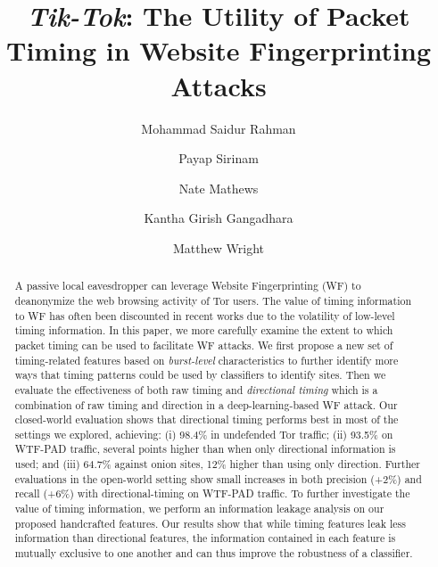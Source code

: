\documentclass[USenglish,oneside,twocolumn]{article}
\newcommand{\attack}{{\em Tik-Tok}}
\begin{document}
\author*[1]{Mohammad Saidur Rahman}

  \author[2]{Payap Sirinam}

  \author[3]{Nate Mathews}

  \author[4]{Kantha Girish Gangadhara}

  \author[5]{Matthew Wright}







  \title{\huge \attack: The Utility of Packet Timing in Website Fingerprinting Attacks}

  \runningtitle{\attack}



\begin{abstract}
{
A passive local eavesdropper can leverage Website Fingerprinting (WF) to deanonymize the web browsing activity of Tor users. The value of timing information to WF has often been discounted in recent works due to the volatility of low-level timing information. In this paper, we more carefully examine the extent to which packet timing can be used to facilitate WF attacks. We first propose a new set of timing-related features based on \emph{burst-level} characteristics to further identify more ways that timing patterns could be used by classifiers to identify sites. Then we evaluate the effectiveness of both raw timing and \emph{directional timing} which is a combination of raw timing and direction in a deep-learning-based WF attack. Our closed-world evaluation shows that directional timing performs best in most of the settings we explored, achieving: (i) 98.4\% in undefended Tor traffic; (ii) 93.5\% on WTF-PAD traffic, several points higher than when only directional information is used; and (iii) 64.7\% against onion sites, 12\% higher than using only direction. Further evaluations in the open-world setting show small increases in both precision (+2\%) and recall (+6\%) with directional-timing on WTF-PAD traffic. To further investigate the value of timing information, we perform an information leakage analysis on our proposed handcrafted features. Our results show that while timing features leak less information than directional features, the information contained in each feature is mutually exclusive to one another and can thus improve the robustness of a classifier.}
\end{abstract} 
\end{document}
